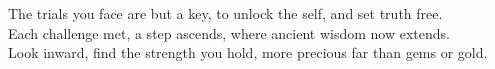 \documentclass{article}
\begin{document}
\begin{infobox}
The trials you face are but a key, to unlock the self, and set truth free.\\
Each challenge met, a step ascends, where ancient wisdom now extends.\\
Look inward, find the strength you hold, more precious far than gems or gold.
\end{infobox}
\end{document}
